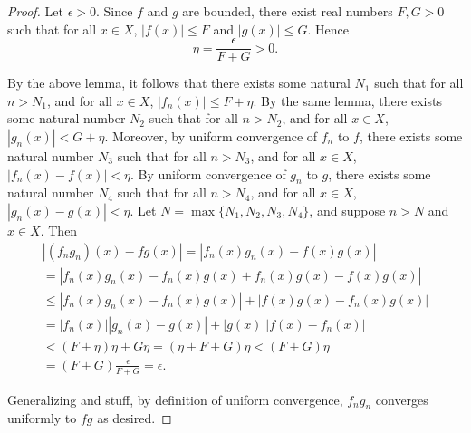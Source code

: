 \documentclass[12pt]{article}
\theoremstyle{definition}
\begin{document}
\begin{proof}
Let $\epsilon> 0$. Since $f$ and $g$ are bounded, there exist real numbers $F, G> 0$ such that for all $ x\in X $, $ |f(x)| \le F $ and $ |g(x)|\le G $. 
Hence 
\[
	\eta = \frac{\epsilon}{F + G} > 0.
\]

By the above lemma, it follows that there exists some natural $N_1$ such that for all $n > N_1$, and for all $x\in X$, $ |f_n(x)|\le F + 
\eta$. By the same lemma, there exists some natural number $ N_2 $ such that for all $n> N_2$, and for all $x\in X$, $ |g_n(x)| < G + \eta $. 
Moreover, by uniform convergence of $f_n$ to $f$, there exists some natural number $N_3$ such that for all $n>N_3$, and for all $x\in X$, 
$| f_n(x) - f(x) | < \eta$. By uniform convergence of $g_n$ to $g$, there exists some natural number $N_4$ such that for all $ n> N_4 $, and 
for all $x\in X$, $ |g_n(x) -g(x)| < \eta $. Let $ N = \max\{N_1, N_2, N_3, N_4\} $, and suppose $n> N$ and $x\in X$. Then 
\begin{equation}
	\begin{split}
		|(f_ng_n)(x) - fg(x)| = |f_n(x)g_n(x) - f(x)g(x)| \\
		= |f_n(x)g_n(x) - f_n(x)g(x) + f_n(x)g(x) - f(x)g(x)|\\
		\le |f_n(x)g_n(x) - f_n(x)g(x)| + |f(x)g(x) - f_n(x)g(x)|\\
		= |f_n(x)||g_n(x) - g(x)| + |g(x)||f(x) - f_n(x)| \\
		< (F + \eta)\eta + G\eta = (\eta + F + G)\eta < (F+G)\eta\\
		= (F+G)\frac{\epsilon}{F+G} = \epsilon.
	\end{split}
\end{equation}

Generalizing and stuff, by definition of uniform convergence, $f_ng_n$ converges uniformly to $fg$ as desired.

\end{proof}
\end{document}

